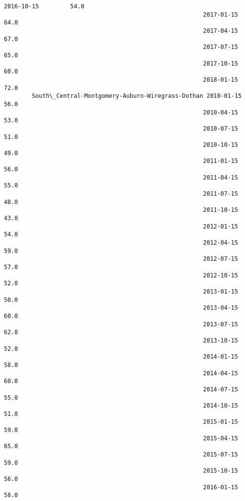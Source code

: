 \documentclass[11pt]{article}
\begin{document}
\begin{Verbatim}[commandchars=\\\{\}]
                                                         2016-10-15         54.0   
                                                         2017-01-15         64.0   
                                                         2017-04-15         67.0   
                                                         2017-07-15         65.0   
                                                         2017-10-15         60.0   
                                                         2018-01-15         72.0   
        South\_Central-Montgomery-Auburn-Wiregrass-Dothan 2010-01-15         56.0   
                                                         2010-04-15         53.0   
                                                         2010-07-15         51.0   
                                                         2010-10-15         49.0   
                                                         2011-01-15         56.0   
                                                         2011-04-15         55.0   
                                                         2011-07-15         48.0   
                                                         2011-10-15         43.0   
                                                         2012-01-15         54.0   
                                                         2012-04-15         59.0   
                                                         2012-07-15         57.0   
                                                         2012-10-15         52.0   
                                                         2013-01-15         50.0   
                                                         2013-04-15         60.0   
                                                         2013-07-15         62.0   
                                                         2013-10-15         52.0   
                                                         2014-01-15         58.0   
                                                         2014-04-15         60.0   
                                                         2014-07-15         55.0   
                                                         2014-10-15         51.0   
                                                         2015-01-15         59.0   
                                                         2015-04-15         65.0   
                                                         2015-07-15         59.0   
                                                         2015-10-15         56.0   
                                                         2016-01-15         58.0   

\end{Verbatim}
\end{document}
